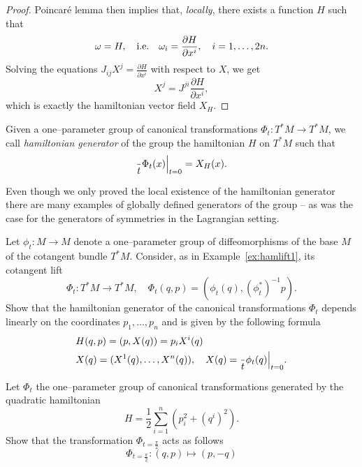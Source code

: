 \documentclass[english,fontsize=11pt,paper=a5,oneside]{scrbook}
\let\d\relax
\DeclareMathOperator{\d}{d}
\theoremstyle{definition}
\newenvironment{exercise}
  {\pushQED{\qed}\renewcommand{\qedsymbol}{$\maltese$}\exercisex}
  {\popQED\endexercisex}
\begin{document}
\begin{proof}
    Poincar\'e lemma \cite{book:lee} then implies that, \emph{locally}, there exists a function $H$ such that
    \begin{equation}
        \omega = \d H, \quad\mbox{i.e.}\quad \omega_i = \frac{\partial H}{\partial x^i}, \quad i=1,\ldots,2n.
    \end{equation}
    Solving the equations $J_{ij} X^j = \frac{\partial H}{\partial x^i}$ with respect to $X$, we get
    \begin{equation}
        X^j = J^{ji} \frac{\partial H}{\partial x^i},
    \end{equation}
    which is exactly the hamiltonian vector field $X_H$.
\end{proof}

\begin{tcolorbox}
    Given a one--parameter group of canonical transformations $\Phi_t:T^*M\to T^*M$, we call \emph{hamiltonian generator} of the group the hamiltonian $H$ on $T^*M$ such that
    \begin{equation}
        \frac{\d }{\d t}\Phi_t(x)\Big|_{t=0} = X_H(x).
    \end{equation}
\end{tcolorbox}

Even though we only proved the local existence of the hamiltonian generator there are many examples of globally defined generators of the group -- as was the case for the generators of symmetries in the Lagrangian setting.

\begin{exercise}
    Let $\phi_t:M\to M$ denote a one--parameter group of diffeomorphisms of the base  $M$ of the cotangent bundle $T^*M$.
    Consider, as in Example~\ref{ex:hamlift1}, its cotangent lift
    \begin{equation}
        \Phi_t:T^*M\to T^*M, \quad \Phi_t(q,p) = \left(\phi_t(q), \left(\phi_t^*\right)^{-1}p\right).
    \end{equation}
    Show that the hamiltonian generator of the canonical transformations $\Phi_t$ depends linearly on the coordinates $p_1, \ldots, p_n$ and is given by the following formula
    \begin{align}
        & H(q,p) = (p, X(q)) = p_i X^i(q) \label{eq:linhamp}\\
        & X(q) = (X^1(q), \ldots, X^n(q)), \quad X(q) = \frac{\d}{\d t} \phi_t(q)\Big|_{t=0}.
    \end{align}
\end{exercise}

\begin{exercise}
    Let $\Phi_t$ the one--parameter group of canonical transformations generated by the quadratic hamiltonian
    \begin{equation}
        H = \frac12 \sum_{i=1}^n\left(p_i^2 + (q^i)^2\right).
    \end{equation}
    Show that the transformation $\Phi_{t=\frac\pi2}$ acts as follows
    \begin{equation}
        \Phi_{t=\frac\pi2} : (q,p) \mapsto (p, -q)
    \end{equation}
\end{exercise}
\end{document}

